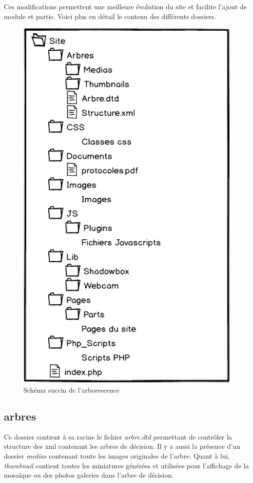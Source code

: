 \documentclass[twoside]{EPURapport}
\begin{document}
	Ces modifications permettent une meilleure évolution du site et facilite l'ajout de module et partie. Voici plus en détail le contenu des différents dossiers.
	
	\begin{figure}[hbtp]
			\centering
			\includegraphics[scale=0.6]{images/arborescence.png}
			\caption{Schéma succin de l'arborescence}
		\end{figure}

		\subsection{arbres}
		Ce dossier contient à sa racine le fichier \emph{arbre.dtd} permettant de contrôler la structure des xml contenant les arbres de décision. Il y a aussi la présence d'un dossier \emph{medias} contenant toute les images originales de l'arbre. Quant à lui, \emph{thumbnail} contient toutes les miniatures générées et utilisées pour l'affichage de la mosaïque ou des photos galeries dans l'arbre de décision.
		
\end{document}
